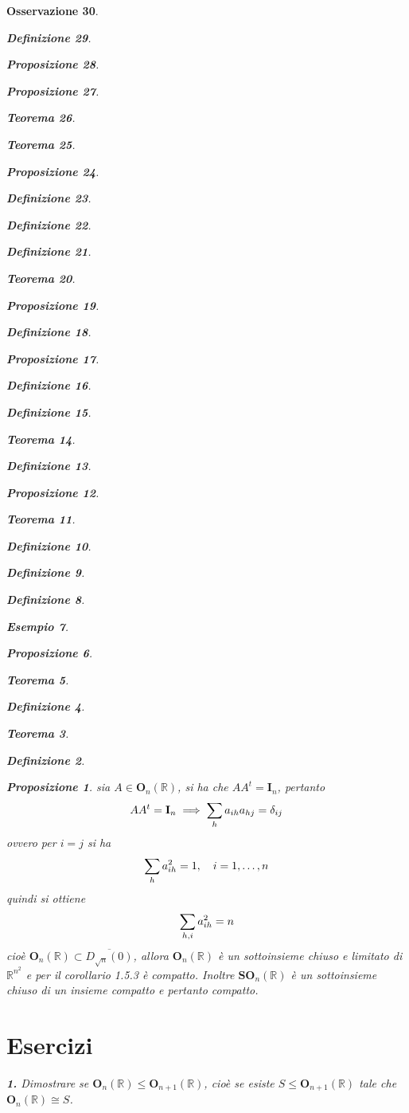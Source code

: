 \documentclass[oneside, 11pt]{amsbook}
\makeatletter
\newcommand{\0}{{(0)}}
\newcommand{\3}{{(3)}}
\theoremstyle{colonplain}
\newtheorem{thm}{Teorema}[chapter]
\newtheorem{prop}[thm]{Proposizione}
\theoremstyle{colondefinition}
\newtheorem{defn}[thm]{Definizione}
\newtheorem{ex}[thm]{Esempio}
\theoremstyle{colonremark}
\newtheorem{rmk}[thm]{Osservazione}
\numberwithin{equation}{chapter}
\renewcommand{\proofname}{Dimostrazione}
\renewenvironment{proof}[1][\proofname]{\par
  \pushQED{\end{proof}}%
  \normalfont \topsep6\p@\@plus6\p@\relax
  \trivlist
  \item[\hskip\labelsep\bfseries #1:]\ignorespaces
}{%
  \popQED\endtrivlist\@endpefalse
}
\makeatother
\begin{document}
\begin{rmk}
\begin{defn}
\begin{prop}
\begin{prop}
\begin{thm}
\begin{thm}
\begin{prop}
\begin{defn}
\begin{defn}
\begin{defn}
\begin{thm}
\begin{prop}
\begin{defn}
\begin{prop}
\begin{defn}
\begin{defn}
\begin{thm}
\begin{defn}
\begin{prop}
\begin{thm}
\begin{defn}
\begin{defn}
\begin{defn}
\begin{ex}
\begin{prop}
\begin{thm}
\begin{defn}
\begin{thm}
\begin{defn}
\begin{prop}
\begin{proof} sia $A \in \mathbf{O}_n(\mathbb{R})$, si ha che $AA^t = \mathbf{I}_n$, pertanto
\begin{align}
    AA^t = \mathbf{I}_n \implies \sum_h a_{ih}a_{hj} = \delta_{ij} \notag
\end{align}
ovvero per $i = j$ si ha
\begin{align}
    \sum_h a^2_{ih} = 1, \quad i = 1, \dots, n \notag
\end{align}
quindi si ottiene
\begin{align}
    \sum_{h, i} a^2_{ih} = n \notag
\end{align}
cioè $\mathbf{O}_n(\mathbb{R}) \subset \overline{D_{\sqrt{n}}(0)}$, allora $\mathbf{O}_n(\mathbb{R})$ è un sottoinsieme chiuso e limitato di $\mathbb{R}^{n^2}$ e per il \textit{corollario 1.5.3} è compatto. Inoltre $\mathbf{SO}_n(\mathbb{R})$ è un sottoinsieme chiuso di un insieme compatto e pertanto compatto. \end{proof}

\section{Esercizi}
\textbf{1.} Dimostrare se $\mathbf{O}_n(\mathbb{R}) \leq \mathbf{O}_{n + 1}(\mathbb{R})$, cioè se esiste $S \leq \mathbf{O}_{n + 1}(\mathbb{R})$ tale che $\mathbf{O}_n(\mathbb{R}) \cong S$. \\


\end{prop}
\end{defn}
\end{thm}
\end{defn}
\end{thm}
\end{prop}
\end{ex}
\end{defn}
\end{defn}
\end{defn}
\end{thm}
\end{prop}
\end{defn}
\end{thm}
\end{defn}
\end{defn}
\end{prop}
\end{defn}
\end{prop}
\end{thm}
\end{defn}
\end{defn}
\end{defn}
\end{prop}
\end{thm}
\end{thm}
\end{prop}
\end{prop}
\end{defn}
\end{rmk}
\end{document}
